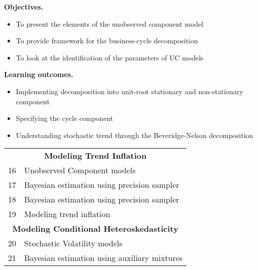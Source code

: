 \documentclass[notes,blackandwhite,mathsans,usenames,dvipsnames]{beamer}
\begin{document}
{
\begin{frame}

\bigskip\textbf{\color{mcxs1}Objectives.}
\begin{itemize}[label=$\blacktriangleright$]
\item {\color{mcxs1}To present the elements of the unobserved component model}
\item {\color{mcxs1}To provide framework for the business-cycle decomposition }
\item {\color{mcxs1}To look at the identification of the parameters of UC models}
\end{itemize}

\bigskip\textbf{\color{lightgray}Learning outcomes.}
\begin{itemize}[label=$\blacktriangleright$]
\item {\color{lightgray}Implementing decomposition into unit-root stationary and non-stationary component}
\item {\color{lightgray}Specifying the cycle component}
\item {\color{lightgray}Understanding stochastic trend through the Beveridge-Nelson decomposition}
\end{itemize}

\end{frame}
}
 


{
\begin{frame}


\bigskip
\begin{center}
\begin{tabular}{ c l}
\toprule 
\multicolumn{2}{c}{\textbf{Modeling Trend Inflation}}\\
16  & Unobserved Component models \\
17  & Bayesian estimation using precision sampler \\
18  & Bayesian estimation using precision sampler \\
19  & Modeling trend inflation \\[1ex]
\multicolumn{2}{c}{\textbf{Modeling Conditional Heteroskedasticity}}\\
20  & Stochastic Volatility models \\
21  & Bayesian estimation using auxiliary mixtures \\[1ex]
\bottomrule
\end{tabular}
\end{center}


\end{frame}
}
\end{document}
